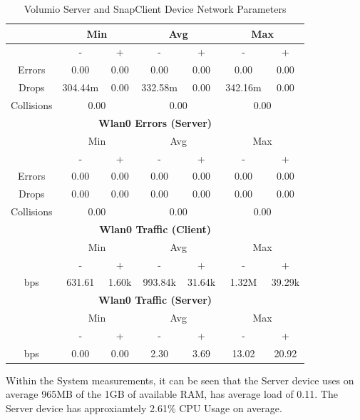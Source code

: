 \documentclass[11pt,a4paper]{scrreprt}
\begin{document}
\begin{table}[H]
\begin{tabular}{||c|c|c|c|c|c|c||}
    \hline\hline
      & \multicolumn{2}{|c|}{Min} & \multicolumn{2}{|c|}{Avg} & \multicolumn{2}{|c|}{Max} \\
    \hline
      & - & + & - & + & - & + \\
    \hline
    Errors  & 0.00 & 0.00 & 0.00 & 0.00 & 0.00 & 0.00 \\
    \hline
    Drops & 304.44m & 0.00 & 332.58m & 0.00 & 342.16m & 0.00 \\
    \hline
    Collisions & \multicolumn{2}{|c|}{0.00} & \multicolumn{2}{|c|}{0.00} & \multicolumn{2}{|c|}{0.00} \\
    \hline\hline
    \multicolumn{7}{|c|}{\textbf{Wlan0 Errors (Server)}} \\
    \hline\hline
      & \multicolumn{2}{|c|}{Min} & \multicolumn{2}{|c|}{Avg} & \multicolumn{2}{|c|}{Max} \\
    \hline
      & - & + & - & + & - & + \\
    \hline
    Errors  & 0.00 & 0.00 & 0.00 & 0.00 & 0.00 & 0.00 \\
    \hline
    Drops & 0.00 & 0.00 & 0.00 & 0.00 & 0.00 & 0.00 \\
    \hline
    Collisions & \multicolumn{2}{|c|}{0.00} & \multicolumn{2}{|c|}{0.00} & \multicolumn{2}{|c|}{0.00} \\
    \hline\hline
    \multicolumn{7}{|c|}{\textbf{Wlan0 Traffic (Client)}} \\
    \hline\hline
      & \multicolumn{2}{|c|}{Min} & \multicolumn{2}{|c|}{Avg} & \multicolumn{2}{|c|}{Max} \\
    \hline
      & - & + & - & + & - & + \\
    \hline
    bps  & 631.61 & 1.60k & 993.84k & 31.64k & 1.32M & 39.29k \\
    \hline\hline
    \multicolumn{7}{|c|}{\textbf{Wlan0 Traffic (Server)}} \\
    \hline\hline
      & \multicolumn{2}{|c|}{Min} & \multicolumn{2}{|c|}{Avg} & \multicolumn{2}{|c|}{Max} \\
    \hline
      & - & + & - & + & - & + \\
    \hline
    bps  & 0.00 & 0.00 & 2.30 & 3.69 & 13.02 & 20.92 \\
    \hline\hline
    \end{tabular}
    \caption{Volumio Server and SnapClient Device Network Parameters}
    \label{VolumioclientserverNetTab}
\end{table}

Within the System measurements, it can be seen that the Server device
uses on average 965MB of the 1GB of available RAM, has average load of
0.11. The Server device has approxiamtely 2.61\% CPU Usage on average.
\end{document}
